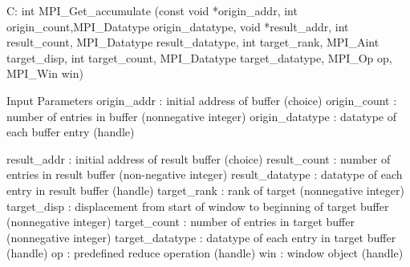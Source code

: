 C:
int MPI_Get_accumulate
   (const void *origin_addr, int origin_count,MPI_Datatype origin_datatype,
    void *result_addr, int result_count, MPI_Datatype result_datatype,
    int target_rank, 
    MPI_Aint target_disp, int target_count, MPI_Datatype target_datatype,
    MPI_Op op, MPI_Win win)

Input Parameters
origin_addr : initial address of buffer (choice)
origin_count : number of entries in buffer (nonnegative integer)
origin_datatype : datatype of each buffer entry (handle)

result_addr : initial address of result buffer (choice)
result_count : number of entries in result buffer (non-negative integer)
result_datatype : datatype of each entry in result buffer (handle)
target_rank : rank of target (nonnegative integer)
target_disp : displacement from start of window to beginning
    of target buffer (nonnegative integer)
target_count : number of entries in target buffer (nonnegative integer)
target_datatype : datatype of each entry in target buffer (handle)
op : predefined reduce operation (handle)
win : window object (handle)

